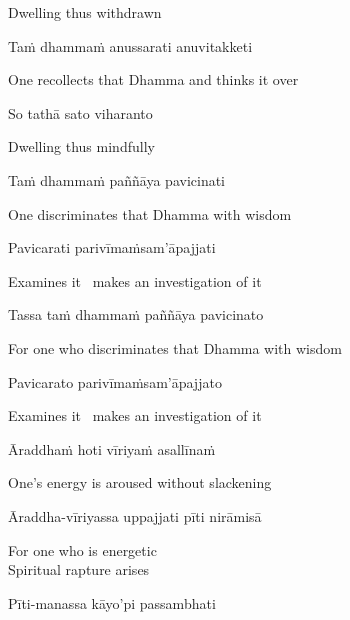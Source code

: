 \begin{english}
  Dwelling thus withdrawn
\end{english}

\ifafiveversion\clearpage\fi
\ifbfiveversion\clearpage\fi

Taṁ dhammaṁ anussarati anuvitakketi

\begin{english}
  One recollects that Dhamma and thinks it over
\end{english}

So tathā sato viharanto

\begin{english}
  Dwelling thus mindfully
\end{english}

Taṁ dhammaṁ paññāya pavicinati

\begin{english}
  One discriminates that Dhamma with wisdom
\end{english}

Pavicarati parivīmaṁsam'āpajjati

\begin{english}
  Examines it \breathmark\ makes an investigation of it
\end{english}

Tassa taṁ dhammaṁ paññāya pavicinato

\begin{english}
  For one who discriminates that Dhamma with wisdom
\end{english}

Pavicarato parivīmaṁsam'āpajjato

\begin{english}
  Examines it \breathmark\ makes an investigation of it
\end{english}

Āraddhaṁ hoti vīriyaṁ asallīnaṁ

\begin{english}
  One's energy is aroused without slackening
\end{english}

Āraddha-vīriyassa uppajjati pīti nirāmisā

\begin{english}
  For one who is energetic\\
  Spiritual rapture arises
\end{english}

\ifninebythirteenversion\clearpage\fi

Pīti-manassa kāyo'pi passambhati

